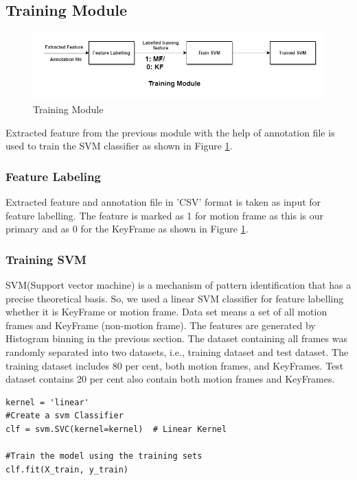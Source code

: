 \subsection{Training Module}
\begin{figure}[H]
    \includegraphics[scale= 0.6]{./Pictures/Algorithm-Training_Module.png}
    \caption{Training Module}
    \label{fig:Ch04F012}
\end{figure}
Extracted feature from the previous module with the help of annotation file is used to train the SVM classifier as shown in Figure \ref{fig:Ch04F012}.


\subsubsection{Feature Labeling}
Extracted feature and annotation file in ’CSV’ format is taken as input for feature labelling. The feature is marked as 1 for motion frame as this is our primary and as 0 for the KeyFrame as shown in Figure \ref{fig:Ch04F012}.



\subsubsection{Training SVM}
SVM(Support vector machine) is a mechanism of pattern identification that has a precise theoretical basis. So, we used a linear SVM classifier for feature labelling whether it is KeyFrame or motion frame.
Data set means a set of all motion frames and KeyFrame (non-motion frame).
The features are generated by Histogram binning in the previous section.
The dataset containing all frames was randomly separated into two datasets, i.e., training dataset and test dataset. The training dataset includes 80 per cent, both motion frames, and KeyFrames. Test dataset contains 20 per cent also contain both motion frames and KeyFrames.



\begin{lstlisting}
kernel = 'linear'
#Create a svm Classifier
clf = svm.SVC(kernel=kernel)  # Linear Kernel

#Train the model using the training sets
clf.fit(X_train, y_train)
\end{lstlisting}


